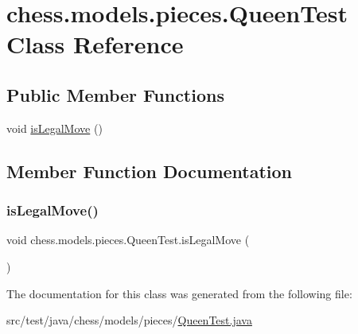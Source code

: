 \hypertarget{classchess_1_1models_1_1pieces_1_1_queen_test}{}\section{chess.\+models.\+pieces.\+Queen\+Test Class Reference}
\label{classchess_1_1models_1_1pieces_1_1_queen_test}
\subsection*{Public Member Functions}
\begin{DoxyCompactItemize}
\item 
void \mbox{\hyperlink{classchess_1_1models_1_1pieces_1_1_queen_test_a1881454d8fbe56b8c8f19895b048a81c}{is\+Legal\+Move}} ()
\end{DoxyCompactItemize}


\subsection{Member Function Documentation}
\mbox{\label{classchess_1_1models_1_1pieces_1_1_queen_test_a1881454d8fbe56b8c8f19895b048a81c}} 
\subsubsection{\texorpdfstring{is\+Legal\+Move()}{isLegalMove()}}
{\footnotesize\ttfamily void chess.\+models.\+pieces.\+Queen\+Test.\+is\+Legal\+Move (\begin{DoxyParamCaption}{ }\end{DoxyParamCaption})}



The documentation for this class was generated from the following file\+:\begin{DoxyCompactItemize}
\item 
src/test/java/chess/models/pieces/\mbox{\hyperlink{_queen_test_8java}{Queen\+Test.\+java}}\end{DoxyCompactItemize}

